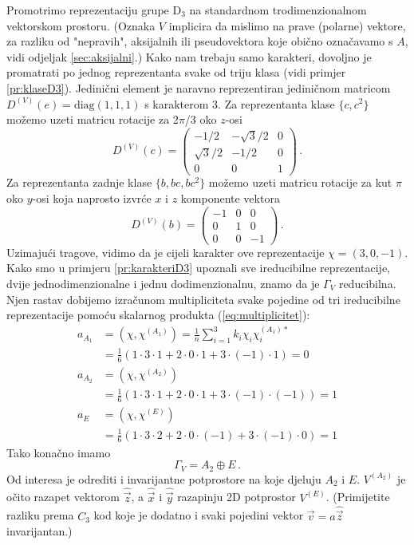 \begin{primjer}
Promotrimo reprezentaciju grupe D$_3$ na standardnom trodimenzionalnom
vektorskom prostoru. (Oznaka $V$ implicira da mislimo na prave (polarne)
vektore, za razliku od "nepravih", aksijalnih ili pseudovektora koje obično
označavamo s $A$, vidi odjeljak \ref{sec:aksijalni}.) Kako nam trebaju samo
karakteri, dovoljno je promatrati po jednog reprezentanta svake od triju klasa
(vidi primjer \ref{pr:klaseD3}).
Jedinični element je naravno reprezentiran jediničnom matricom
$D^{(V)}(e)=\textrm{diag}(1,1,1)$ s karakterom 3.
Za reprezentanta klase $\{c, c^2\}$ možemo uzeti matricu rotacije
za 2$\pi$/3 oko $z$-osi
\begin{equation}
D^{(V)}(c)=
\begin{pmatrix}
-1/2 & -\sqrt{3}/2 & 0 \\
\sqrt{3}/2 & -1/2 & 0 \\
0 & 0 & 1
\end{pmatrix} \,.
\end{equation}
Za reprezentanta zadnje klase $\{b, bc, bc^2\}$ možemo uzeti matricu
rotacije za kut $\pi$ oko $y$-osi  koja naprosto izvrće $x$ i $z$
komponente vektora
\begin{equation}
D^{(V)}(b)=
\begin{pmatrix}
-1 & 0 & 0 \\
0 & 1 & 0 \\
0 & 0 & -1
\end{pmatrix} \,.
\label{eq:DVbD3}
\end{equation}
Uzimajući tragove, vidimo da je cijeli karakter ove reprezentacije
$\chi=(3,0,-1)$.
Kako smo u primjeru \ref{pr:karakteriD3} upoznali sve ireducibilne
reprezentacije, dvije jednodimenzionalne i jednu dodimenzionalnu,
znamo da je $\Gamma_V$ reducibilna. Njen rastav dobijemo izračunom 
multipliciteta svake pojedine od tri
ireducibilne reprezentacije pomoću skalarnog produkta (\ref{eq:multiplicitet}):
\begin{align*}
    a_{A_1}& = (\chi, \chi^{(A_1)})=\frac{1}{n}\sum_{i=1}^{3} k_i \chi_i \chi^{(A_1)*}_i \\
 & = \frac{1}{6}(1\cdot 3\cdot 1 + 2\cdot 0\cdot 1 + 3\cdot (-1) \cdot 1)=0\\
    a_{A_2}& = (\chi, \chi^{(A_2)}) \\
 & =\frac{1}{6}(1\cdot 3\cdot 1 + 2\cdot 0\cdot 1 + 3\cdot (-1)\cdot(-1))=1\\
    a_{E}& = (\chi, \chi^{(E)}) \\
 & =\frac{1}{6}(1\cdot 3\cdot 2 + 2\cdot 0\cdot (-1) + 3\cdot (-1)\cdot 0)=1
\end{align*}
Tako konačno imamo
\begin{equation}
\Gamma_V  = A_2 \oplus E \,.
\end{equation}
Od interesa je odrediti i invarijantne potprostore na koje djeluju
$A_2$ i $E$.
$V^{(A_2)}$ je očito razapet vektorom $\hat{\vec{z}}$, a $\hat{\vec{x}}$ i
$\hat{\vec{y}}$ razapinju 2D potprostor $V^{(E)}$. (Primijetite razliku
prema $C_3$ kod koje je dodatno i svaki pojedini vektor $\vec{v}=a\hat{\vec{z}}$ invarijantan.)
\end{primjer}



